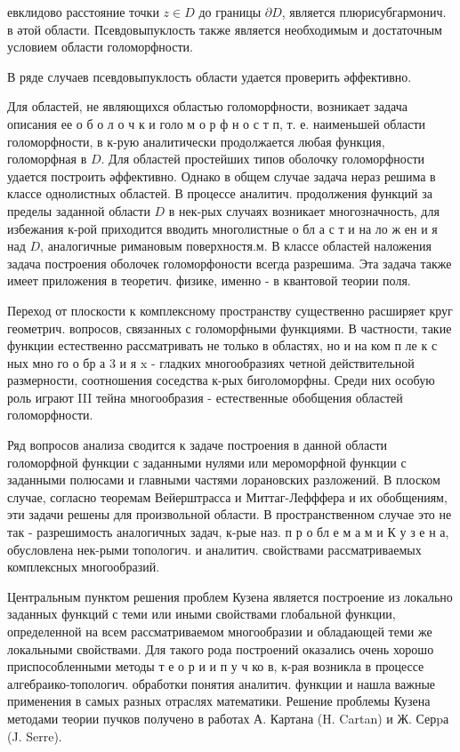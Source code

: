 \documentclass[10pt]{article}
\begin{document}
евклидово расстояние точки $z \in D$ до границы $\partial D$, является плюрисубгармонич. в әтой области. Псевдовыпуклость также является необходимым и достаточным условием области голоморфности.



В ряде случаев псевдовыпуклость области удается проверить әффективно.



Для областей, не являющихся областью голоморфности, возникает задача описания ее о б о л о ч к и голо м о р ф н о с т п, т. е. наименьшей области голоморфности, в к-рую аналитически продолжается любая функция, голоморфная в $D$. Для областей простейших типов оболочку голоморфности удается построить әффективно. Однако в общем случае задача нераз решима в классе однолистных областей. В процессе аналитич. продолжения функций за пределы заданной области $D$ в нек-рых случаях возникает многозначность, для избежания к-рой приходится вводить многолистные о бл а с т и на ло ж ен и я над $D$, аналогичные римановым поверхностя.м. В классе областей наложения задача построения оболочек голоморфоности всегда разрешима. Эта задача также имеет приложения в теоретич. физике, именно - в квантовой теории поля.



Переход от плоскости к комплексному пространству существенно расширяет круг геометрич. вопросов, связанных с голоморфными функциями. В частности, такие функции естественно рассматривать не только в областях, но и на ком п ле к с ных мно го о бр а 3 и я $\mathrm{x}$ - гладких многообразиях четной действительной размерности, соотношения соседства к-рых биголоморфны. Среди них особую роль играют III тейна многообразия - естественные обобщения областей голоморфности.



Ряд вопросов анализа сводится к задаче построения в данной области голоморфной функции с заданными нулями или мероморфной функции с заданными полюсами и главными частями лорановских разложений. В плоском случае, согласно теоремам Вейерштрасса и Миттаг-Лефффера и их обобщениям, эти задачи решены для произвольной области. В пространственном случае это не так - разрешимость аналогичных задач, к-рые наз. п р о бл е м а м и К у з е н а, обусловлена нек-рыми топологич. и аналитич. свойствами рассматриваемых комплексных многообразий.



Центральным пунктом решения проблем Кузена является построение из локально заданных функций с теми или иными свойствами глобальной функции, определенной на всем рассматриваемом многообразии и обладающей теми же локальными свойствами. Для такого рода построений оказались очень хорошо приспособленными методы т е о р и и п у ч ко в, к-рая возникла в процессе алгебраико-топологич. обработки понятия аналитич. функции и нашла важные применения в самых разных отраслях математики. Решение проблемы Кузена методами теории пучков получено в работах А. Картана (H. Cartan) и Ж. Серpа (J. Serre).
\end{document}
